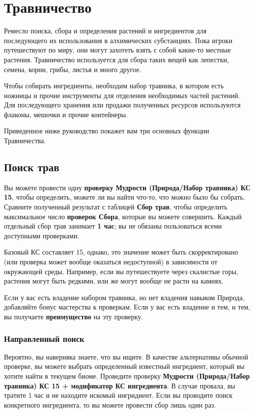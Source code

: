 \documentclass[a4paper, 9pt, twocolumn]{book}
\begin{document}
	
	
	\section{Травничество}
	
	Ремесло поиска, сбора и определения растений и ингредиентов для последующего их использования в алхимических субстанциях. Пока игроки путешествуют по миру, они могут захотеть взять с собой какие-то местные растения. Травничество используется для сбора таких вещей как лепестки, семена, корни, грибы, листья и много другое.
	
	Чтобы собирать ингредиенты, необходим набор травника, в котором есть ножницы и прочие инструменты для отделения необходимых частей растений. Для последующего хранения или продажи полученных ресурсов используются флаконы, мешочки и прочие контейнеры.
	
	Приведенное ниже руководство покажет вам три основных функции Травничества.
	
	\subsection{Поиск трав}
	
	Вы можете провести одну \textbf{проверку Мудрости (Природа/Набор травника) КС 15}, чтобы определить, можете ли вы найти что-то, что можно было бы собрать. Сравните полученный результат с таблицей \textbf{Сбор трав}, чтобы определить максимальное число \textbf{проверок Сбора}, которые вы можете совершить. Каждый отдельный сбор трав занимает \textbf{1 час}; вы не обязаны пользоваться всеми доступными проверками.
	
	Базовый КС составляет 15, однако, это значение может быть скорректировано (или проверка может вообще оказаться недоступной) в зависимости от окружающей среды. Например, если вы путешествуете через скалистые горы, растения могут быть редкими, или же могут вообще не расти на камнях.
	
	Если у вас есть владение набором травника, но нет владения навыком Природа, добавляйте бонус мастерства к проверкам. Если у вас есть владение и тем, и тем, вы получаете \textbf{преимущество} на эту проверку.
	
	\subsubsection*{Направленный поиск}
	
	Вероятно, вы наверняка знаете, что вы ищите. В качестве альтернативы обычной проверке, вы можете выбрать определенный известный ингредиент, который вы хотите найти в текущем биоме. Проведите проверку \textbf{Мудрости (Природа/Набор травника) КС 15 + модификатор КС ингредиента}. В случае провала, вы тратите 1 час и не находите искомый ингридиент. Если вы проводите поиск конкретного ингредиента, то вы можете провести сбор лишь один раз.
	
\end{document}
